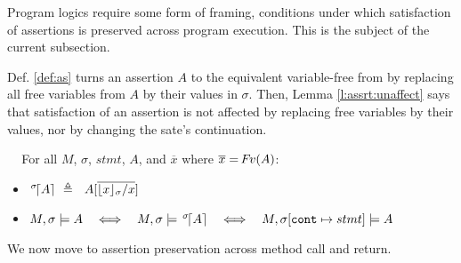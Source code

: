 
Program logics require some form of framing, \ie conditions under which  satisfaction of  assertions is preserved across program execution. 
This is the subject of  the current subsection.

Def. \ref{def:as}  turns an assertion  $A$ %
to the equivalent variable-free from by replacing all free variables from $A$ by their values in $\sigma$. %
 Then,   Lemma \ref{l:assrt:unaffect}  says  that 
satisfaction of an assertion is not affected by replacing free  variables by their values, nor by changing the sate's continuation.

\begin{definitionAndLemma} $ $ ~
\label{def:as}
\label{lemma:addr:expr}
\label{l:assrt:unaffect}
For all $M$, $\sigma$,  $stmt$,   $A$, and $\overline x$ where  $\overline x = {\hspace{-1pt}F\hspace{-1pt}}v{(A)}$:

\begin{itemize}  
\item

${\as  \sigma A} \ \triangleq \ \ A[\overline {{\interpret {\sigma} {x}}/x}]$\  
\item
$\satisfiesA{M}{\sigma}{A}   \ \ \ \Longleftrightarrow\ \ \ \satisfiesA{M}{\sigma}{{\as {\sigma} A} }    \ \ \ \Longleftrightarrow\ \ \  \satisfiesA{M}{\sigma[\prg{cont}\mapsto stmt]}{A}$ 
\end{itemize}
\end{definitionAndLemma}

%
%
%

 \noindent
We now move to assertion preservation across method call and return.  

